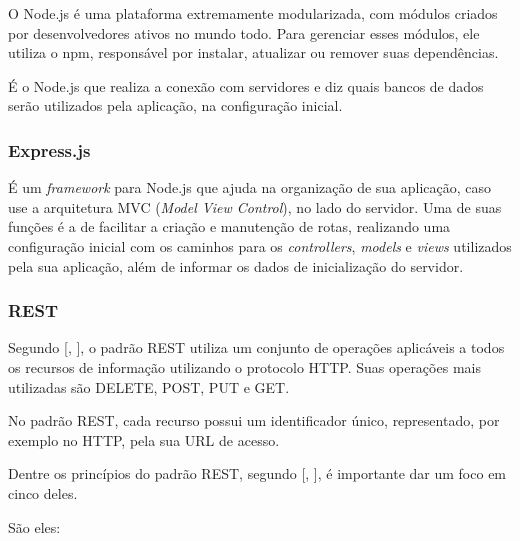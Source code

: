 \documentclass[
	12pt,				%
	oneside,			%
	a4paper,			%
	brazil				%
]{abntex2}
\newcommand{\citecustom}[1]{[\citeauthoronline{#1}, \citeyear{#1}]}
\begin{document}
O Node.js é uma plataforma extremamente modularizada, com módulos criados por desenvolvedores ativos no mundo todo. Para gerenciar esses módulos, ele utiliza o npm, responsável por instalar, atualizar ou remover suas dependências. 

É o Node.js que realiza a conexão com servidores e diz quais bancos de dados serão utilizados pela aplicação, na configuração inicial.


\subsubsection{Express.js}

É um \textit{framework} para Node.js que ajuda na organização de sua aplicação, caso use a arquitetura MVC (\textit{Model View Control}), no lado do servidor. Uma de suas funções é a de facilitar a criação e manutenção de rotas, realizando uma configuração inicial com os caminhos para os \textit{controllers}, \textit{models} e \textit{views} utilizados pela sua aplicação, além de informar os dados de inicialização do servidor.


\subsubsection{REST}

Segundo \citecustom{Almeida2016}, o padrão REST utiliza um conjunto de operações aplicáveis a todos os recursos de informação utilizando o protocolo HTTP. Suas operações mais utilizadas são DELETE, POST, PUT e GET.

No padrão REST, cada recurso possui um identificador único, representado, por exemplo no HTTP, pela sua URL de acesso.

Dentre os princípios do padrão REST, segundo \citecustom{Gomes2009}, é importante dar um foco em cinco deles.

São eles: 
\end{document}
